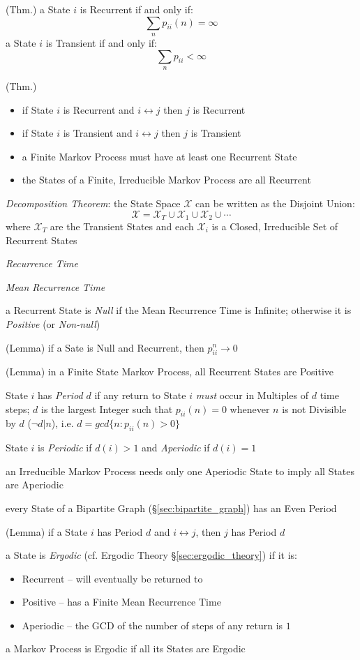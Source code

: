 (Thm.) a State $i$ is Recurrent if and only if:
\[
  \sum_n p_{ii}(n) = \infty
\]
a State $i$ is Transient if and only if:
\[
  \sum_n p_{ii} < \infty
\]

(Thm.)
\begin{itemize}
  \item if State $i$ is Recurrent and $i \leftrightarrow j$ then $j$ is
    Recurrent
  \item if State $i$ is Transient and $i \leftrightarrow j$ then $j$ is
    Transient
  \item a Finite Markov Process must have at least one Recurrent State
  \item the States of a Finite, Irreducible Markov Process are all Recurrent
\end{itemize}

\emph{Decomposition Theorem}:
the State Space $\mathcal{X}$ can be written as the Disjoint Union:
\[
  \mathcal{X} = \mathcal{X}_T \cup \mathcal{X}_1 \cup \mathcal{X}_2 \cup \cdots
\]
where $\mathcal{X}_T$ are the Transient States and each $\mathcal{X}_i$ is a
Closed, Irreducible Set of Recurrent States

\emph{Recurrence Time}

\emph{Mean Recurrence Time}

a Recurrent State is \emph{Null} if the Mean Recurrence Time is Infinite;
otherwise it is \emph{Positive} (or \emph{Non-null})

(Lemma) if a Sate is Null and Recurrent, then $p_{ii}^n \rightarrow 0$

(Lemma) in a Finite State Markov Process, all Recurrent States are Positive

State $i$ has \emph{Period} $d$ if any return to State $i$ \emph{must} occur in
Multiples of $d$ time steps; $d$ is the largest Integer such that
$p_{ii}(n) = 0$ whenever $n$ is not Divisible by $d$ ($\neg d | n$), i.e.
$d = gcd\{n : p_{ii}(n) > 0 \}$

State $i$ is \emph{Periodic} if $d(i) > 1$ and \emph{Aperiodic} if $d(i) = 1$

an Irreducible Markov Process needs only one Aperiodic State to imply all States
are Aperiodic

every State of a Bipartite Graph (\S\ref{sec:bipartite_graph}) has an Even
Period

(Lemma) if a State $i$ has Period $d$ and $i \leftrightarrow j$, then $j$ has
Period $d$

a State is \emph{Ergodic} (cf. Ergodic Theory \S\ref{sec:ergodic_theory}) if it
is:
\begin{itemize}
  \item Recurrent -- will eventually be returned to
  \item Positive -- has a Finite Mean Recurrence Time
  \item Aperiodic -- the GCD of the number of steps of any return is $1$
\end{itemize}
a Markov Process is Ergodic if all its States are Ergodic

